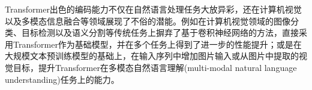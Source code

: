 Transformer出色的编码能力不仅在自然语言处理任务大放异彩，还在计算机视觉以及多模态信息融合等领域展现了不俗的潜能。例如在计算机视觉领域的图像分类、目标检测以及语义分割等传统任务上摒弃了基于卷积神经网络的方法，直接采用Transformer作为基础模型，并在多个任务上得到了进一步的性能提升；或是在大规模文本预训练模型的基础上，在输入序列中增加图片输入或从图片中提取的视觉目标，提升Transformer在多模态自然语言理解(multi-modal natural language understanding)任务上的能力。

